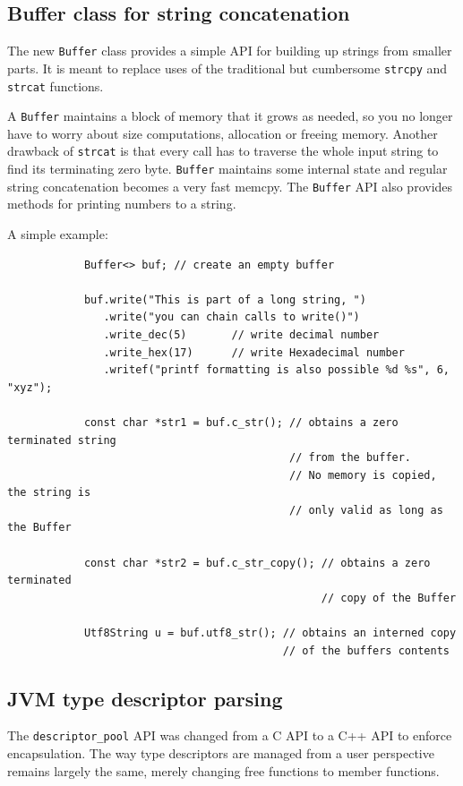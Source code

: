 \documentclass[12pt,a4paper,oneside]{article}
\newcommand{\cpp}[1]{\lstinline[language=C++]{#1}}
\begin{document}
\subsection{Buffer class for string concatenation}
	The new \cpp{Buffer} class provides a simple API for building up strings from smaller parts.
	It is meant to replace uses of the traditional but cumbersome \cpp{strcpy} and \cpp{strcat} functions.

	A \cpp{Buffer} maintains a block of memory that it grows as needed, so you no longer have to worry about 
	size computations, allocation or freeing memory.
	Another drawback of \cpp{strcat} is that every call has to traverse the whole input string to find its terminating zero byte.
	\cpp{Buffer} maintains some internal state and regular string concatenation becomes a very fast memcpy.
	The \cpp{Buffer} API also provides methods for printing numbers to a string.

	A simple example:
		\begin{lstlisting}
			Buffer<> buf; // create an empty buffer

			buf.write("This is part of a long string, ")
			   .write("you can chain calls to write()")
			   .write_dec(5)       // write decimal number
			   .write_hex(17)      // write Hexadecimal number
			   .writef("printf formatting is also possible %d %s", 6, "xyz");

			const char *str1 = buf.c_str(); // obtains a zero terminated string
			                                // from the buffer.
			                                // No memory is copied, the string is
			                                // only valid as long as the Buffer

			const char *str2 = buf.c_str_copy(); // obtains a zero terminated
			                                     // copy of the Buffer

			Utf8String u = buf.utf8_str(); // obtains an interned copy 
			                               // of the buffers contents
		\end{lstlisting}

\subsection{JVM type descriptor parsing}
	The \cpp{descriptor_pool} API was changed from a C API to a C++ API to enforce encapsulation.
	The way type descriptors are managed from a user perspective remains largely the same, merely 
	changing free functions to member functions.
	
\end{document}
